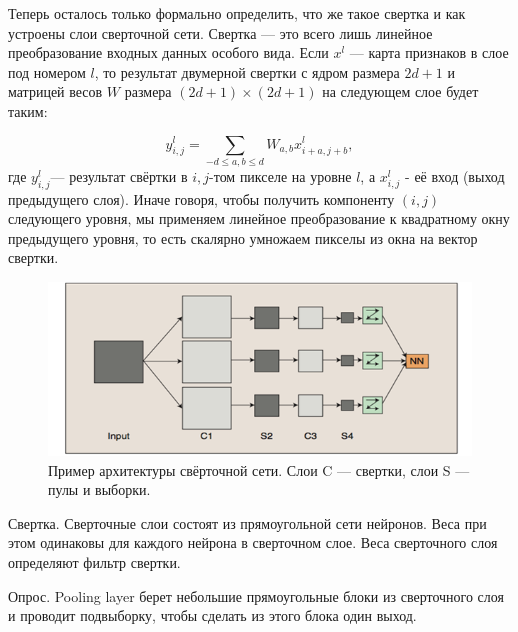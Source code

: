 Теперь осталось только формально определить, что же такое свертка и как
устроены слои сверточной сети. Свертка — это всего лишь линейное преобразование входных данных особого вида. Если $x^l$ — карта признаков в слое под номером $l$, то результат двумерной свертки с ядром размера $2d + 1$ и матрицей весов $W$ размера $(2d + 1) × (2d + 1)$ на следующем слое будет таким:

\[
y^l_{i,j}= \sum_{-d\leqslant a ,b \leqslant d} {W_{a,b}x^l_{i+a,j+b}},
\]
где $y^l_{i,j}$--- результат свёртки в $i,j$-том пикселе на уровне $l$, 
а $x^l_{i,j}$ - её вход (выход предыдущего слоя). Иначе говоря, чтобы получить компоненту $(i,j)$ следующего уровня, мы применяем линейное преобразование к квадратному окну предыдущего уровня, то есть скалярно умножаем пикселы из окна на вектор свертки.

\begin{figure}[h]
	\centering
	\includegraphics[width=0.7\linewidth]{img/conv}
	\caption{Пример архитектуры свёрточной сети. Слои C — свертки, слои S — пулы и выборки.}
	\label{fig:conv}
\end{figure}

\begin{definition}
Свертка. Сверточные слои состоят из прямоугольной сети нейронов. Веса при этом одинаковы для каждого нейрона в сверточном слое. Веса сверточного слоя определяют фильтр свертки.
\end{definition}

\begin{definition}
Опрос. Pooling layer берет небольшие прямоугольные блоки из сверточного слоя и проводит подвыборку, чтобы сделать из этого блока один выход.
\end{definition}


